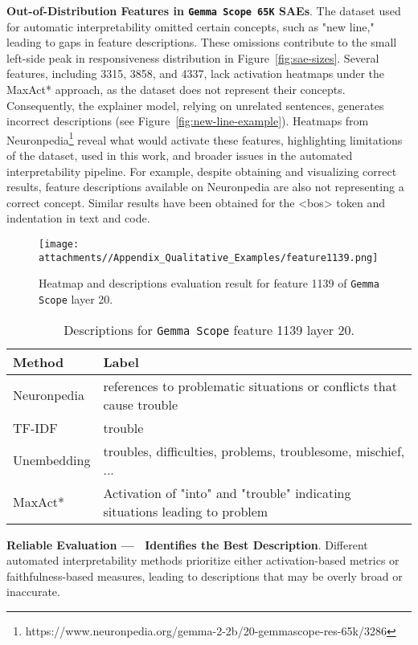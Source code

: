 \textbf{Out-of-Distribution Features in \texttt{Gemma Scope 65K} SAEs}. The dataset used for automatic interpretability omitted certain concepts, such as "new line," leading to gaps in feature descriptions. These omissions contribute to the small left-side peak in responsiveness distribution in Figure~\ref{fig:sae-sizes}. Several features, including 3315, 3858, and 4337, lack activation heatmaps under the MaxAct* approach, as the dataset does not represent their concepts. Consequently, the explainer model, relying on unrelated sentences, generates incorrect descriptions (see Figure~\ref{fig:new-line-example}). Heatmaps from Neuronpedia\footnote{https://www.neuronpedia.org/gemma-2-2b/20-gemmascope-res-65k/3286} reveal what would activate these features, highlighting limitations of the dataset, used in this work, and broader issues in the automated interpretability pipeline. For example, despite obtaining and visualizing correct results, feature descriptions available on Neuronpedia are also not representing a correct concept. Similar results have been obtained for the <bos> token and indentation in text and code.

\begin{figure}[t]
    \centering
    \texttt{[image: attachments//Appendix\_Qualitative\_Examples/feature1139.png]}
    \caption{Heatmap and descriptions evaluation result for feature 1139 of \texttt{Gemma Scope} layer 20.}
    \label{fig:feature 1139}
\end{figure}

\begin{table}[t]
\scriptsize
\centering
\begin{tabular}{p{1.5cm}p{5.5cm}}
Method & Label  \\ \hline \hline
Neuronpedia & references to problematic situations or conflicts that cause trouble  \\
TF-IDF & trouble \\
Unembedding & troubles, difficulties, problems, troublesome, mischief, ...\\
MaxAct* & Activation of "into" and "trouble" indicating situations leading to problem \\ \hline
\end{tabular}
\caption{Descriptions for \texttt{Gemma Scope} feature 1139 layer 20.}
\label{tab:feature1139}
\end{table}

\textbf{Reliable Evaluation — \ours\ Identifies the Best Description}. Different automated interpretability methods prioritize either activation-based metrics or faithfulness-based measures, leading to descriptions that may be overly broad or inaccurate. 

